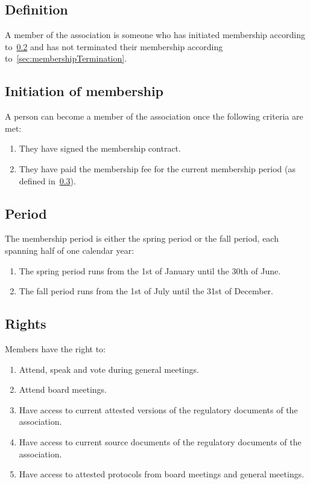 \subsection{Definition}
A member of the association is someone who has initiated membership according to~\ref{sec:membershipInitiation} 
and has not terminated their membership according to~\ref{sec:membershipTermination}.

\subsection{Initiation of membership}\label{sec:membershipInitiation}
A person can become a member of the association once the following criteria are met:
\begin{enumerate}
  \item They have signed the membership contract. %
  \item They have paid the membership fee for the current membership period (as defined in~\ref{sec:membershipPeriod}).
\end{enumerate}

\subsection{Period} \label{sec:membershipPeriod}
The membership period is either the spring period or the fall period, each spanning half of one calendar year:

\begin{enumerate}
  \item The spring period runs from the 1st of January until the 30th of June.
  \item The fall period runs from the 1st of July until the 31st of December.
\end{enumerate}

\subsection{Rights}
Members have the right to: 
\begin{enumerate}
  \item Attend, speak and vote during general meetings.
  \item Attend board meetings.
  \item Have access to current attested versions of the regulatory documents of the association.
  \item Have access to current source documents of the regulatory documents of the association.
  \item Have access to attested protocols from board meetings and general meetings.
\end{enumerate}

